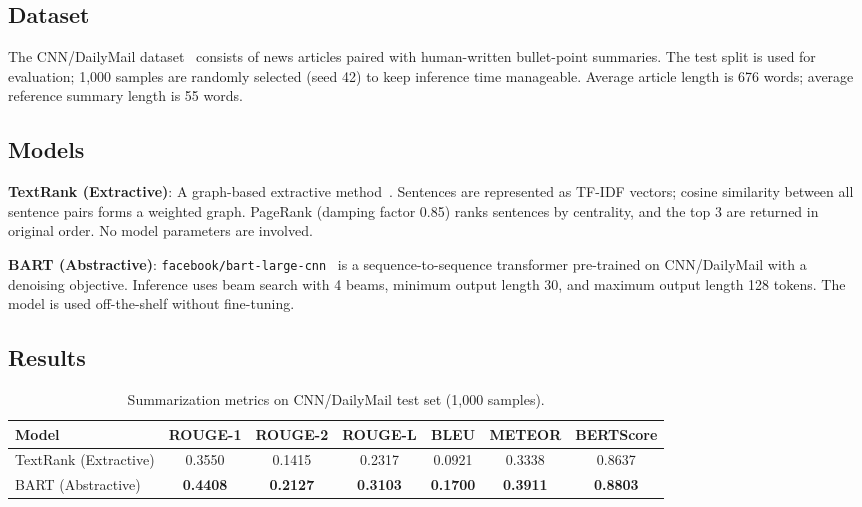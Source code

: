 \documentclass[12pt,a4paper]{article}
\begin{document}
\subsection{Dataset}

The CNN/DailyMail dataset~\citep{hermann2015cnndm} consists of news articles paired with human-written bullet-point summaries. The test split is used for evaluation; 1{,}000 samples are randomly selected (seed 42) to keep inference time manageable. Average article length is 676 words; average reference summary length is 55 words.

\subsection{Models}

\textbf{TextRank (Extractive)}: A graph-based extractive method~\citep{mihalcea2004textrank}. Sentences are represented as TF-IDF vectors; cosine similarity between all sentence pairs forms a weighted graph. PageRank (damping factor 0.85) ranks sentences by centrality, and the top 3 are returned in original order. No model parameters are involved.

\textbf{BART (Abstractive)}: \texttt{facebook/bart-large-cnn}~\citep{lewis2020bart} is a sequence-to-sequence transformer pre-trained on CNN/DailyMail with a denoising objective. Inference uses beam search with 4 beams, minimum output length 30, and maximum output length 128 tokens. The model is used off-the-shelf without fine-tuning.

\subsection{Results}

\begin{table}[H]
\centering
\caption{Summarization metrics on CNN/DailyMail test set (1{,}000 samples).}
\label{tab:q3_results}
\begin{tabular}{lcccccc}
\toprule
\textbf{Model} & \textbf{ROUGE-1} & \textbf{ROUGE-2} & \textbf{ROUGE-L} & \textbf{BLEU} & \textbf{METEOR} & \textbf{BERTScore} \\
\midrule
TextRank (Extractive) & 0.3550 & 0.1415 & 0.2317 & 0.0921 & 0.3338 & 0.8637 \\
BART (Abstractive)    & \textbf{0.4408} & \textbf{0.2127} & \textbf{0.3103} & \textbf{0.1700} & \textbf{0.3911} & \textbf{0.8803} \\
\bottomrule
\end{tabular}
\end{table}
\end{document}
